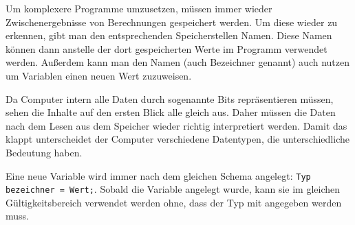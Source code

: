 

Um komplexere Programme umzusetzen, müssen immer wieder Zwischenergebnisse von Berechnungen gespeichert werden.
Um diese wieder zu erkennen, gibt man den entsprechenden Speicherstellen Namen.
Diese Namen können dann anstelle der dort gespeicherten Werte im Programm verwendet werden.
Außerdem kann man den Namen (auch Bezeichner genannt) auch nutzen um Variablen einen neuen Wert zuzuweisen.

Da Computer intern alle Daten durch sogenannte Bits repräsentieren müssen, sehen die Inhalte auf den ersten Blick alle gleich aus.
Daher müssen die Daten nach dem Lesen aus dem Speicher wieder richtig interpretiert werden.
Damit das klappt unterscheidet der Computer verschiedene Datentypen, die unterschiedliche Bedeutung haben.

Eine neue Variable wird immer nach dem gleichen Schema angelegt: \lstinline|Typ bezeichner = Wert;|.
Sobald die Variable angelegt wurde, kann sie im gleichen Gültigkeitsbereich verwendet werden ohne, dass der Typ mit angegeben werden muss.


